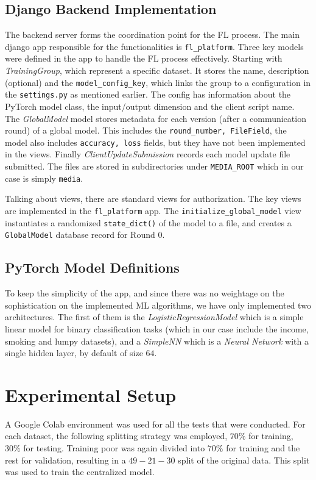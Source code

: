 \documentclass[10pt,twocolumn]{article}
\begin{document}
\subsection{Django Backend Implementation}
The backend server forms the coordination point for the FL process. The main django app responsible for the functionalities is \texttt{fl\_platform}. Three key models were defined in the app to handle the FL process effectively. Starting with \textit{TrainingGroup}, which represent a specific dataset. It stores the name, description (optional) and the \texttt{model\_config\_key}, which links the group to a configuration in the \texttt{settings.py} as mentioned earlier. The config has information about the PyTorch model class, the input/output dimension and the client script name. The \textit{GlobalModel} model stores metadata for each version (after a communication round) of a global model. This includes the \texttt{round\_number, FileField}, the model also includes \texttt{accuracy, loss} fields, but they have not been implemented in the views. Finally \textit{ClientUpdateSubmission} records each model update file submitted. The files are stored in subdirectories under \texttt{MEDIA\_ROOT} which in our case is simply \texttt{media}. 

Talking about views, there are standard views for authorization. The key views are implemented in the \texttt{fl\_platform} app. The \texttt{initialize\_global\_model} view instantiates a randomized \texttt{state\_dict()} of the model to a file, and creates a \texttt{GlobalModel} database record for Round 0.  

\subsection{PyTorch Model Definitions}
To keep the simplicity of the app, and since there was no weightage on the sophistication on the implemented ML algorithms, we have only implemented two architectures. The first of them is the \textit{LogisticRegressionModel} which is a simple linear model for binary classification tasks (which in our case include the income, smoking and lumpy datasets), and a \textit{SimpleNN} which is a \textit{Neural Network} with a single hidden layer, by default of size $64$. 

\section{Experimental Setup}
A Google Colab environment was used for all the tests that were conducted. For each dataset, the following splitting strategy was employed, $70\%$ for training, $30\%$ for testing. Training poor was again divided into $70\%$ for training and the rest for validation, resulting in a $49-21-30$ split of the original data. This split was used to train the centralized model. 
\end{document}
